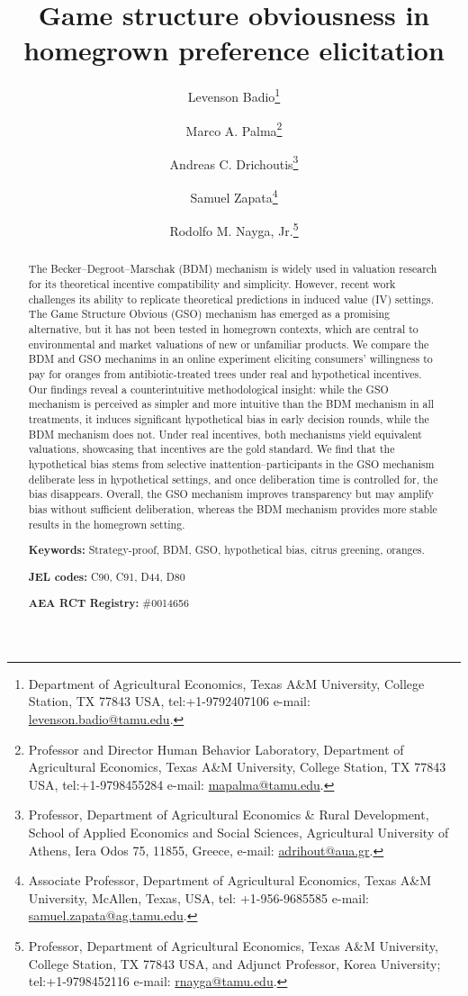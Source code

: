 \documentclass[12pt]{article}
\title{\textbf{Game structure obviousness in homegrown preference elicitation}}
\author[1]{Levenson Badio\thanks{Department of Agricultural Economics, Texas A\&M University, College Station, TX  77843 USA, tel:+1-9792407106 e-mail: \href{mailto:levenson.badio@tamu.edu}{levenson.badio@tamu.edu}.}}
\author[1]{Marco A. Palma\thanks{Professor and Director Human Behavior Laboratory, Department of Agricultural Economics, Texas A\&M University, College Station, TX  77843 USA, tel:+1-9798455284 e-mail: \href{mailto:mapalma@tamu.edu}{mapalma@tamu.edu}.}}
\author[2]{Andreas C. Drichoutis\thanks{Professor, Department of Agricultural Economics \& Rural Development, School of Applied Economics and Social Sciences, Agricultural University of Athens, Iera Odos 75, 11855, Greece, e-mail: \href{mailto:adrihout@aua.gr}{adrihout@aua.gr}.}}
\author[1]{Samuel Zapata\thanks{Associate Professor, Department of Agricultural Economics, Texas A\&M University, McAllen, Texas, USA, tel: +1-956-9685585 e-mail: \href{samuel.zapata@ag.tamu.edu}{samuel.zapata@ag.tamu.edu}.}}
\author[1]{Rodolfo M. Nayga, Jr.\thanks{Professor, Department of Agricultural Economics, Texas A\&M University, College Station, TX  77843 USA, and Adjunct Professor, Korea University; tel:+1-9798452116 e-mail: \href{mailto:rnayga@tamu.edu}{rnayga@tamu.edu}.}}
\affil[1]{Texas A\&M University}
\affil[2]{Agricultural University of Athens}
\date{}
\begin{document}
\maketitle
 \onehalfspacing

\begin{abstract}
\noindent The Becker–Degroot–Marschak (BDM) mechanism is widely used in valuation research for its theoretical incentive compatibility and simplicity. However, recent work challenges its ability to replicate theoretical predictions in induced value (IV) settings. The Game Structure Obvious (GSO) mechanism has emerged as a promising alternative, but it has not been tested in homegrown contexts, which are central to environmental and market valuations of new or unfamiliar products.
We compare the BDM and GSO mechanims in an online experiment eliciting consumers’ willingness to pay for oranges from antibiotic-treated trees under real and hypothetical incentives.
Our findings reveal a counterintuitive methodological insight: while the GSO mechanism is perceived as simpler and more intuitive than the BDM mechanism in all treatments, it induces significant hypothetical bias in early decision rounds, while the BDM mechanism does not. Under real incentives, both mechanisms yield equivalent valuations, showcasing that incentives are the gold standard. 
We find that the hypothetical bias stems from selective inattention--participants in the GSO mechanism deliberate less in hypothetical settings, and once deliberation time is controlled for, the bias disappears. Overall, the GSO mechanism improves transparency but may amplify bias without sufficient deliberation, whereas the BDM mechanism provides more stable results in the homegrown setting.

\textbf{Keywords:} Strategy-proof, BDM, GSO, hypothetical bias, citrus greening, oranges. 
	
\textbf{JEL codes:} C90, C91, D44, D80
 
 \textbf{AEA RCT Registry:} \#0014656
 
 \end{abstract}


\onehalfspacing
\end{document}
